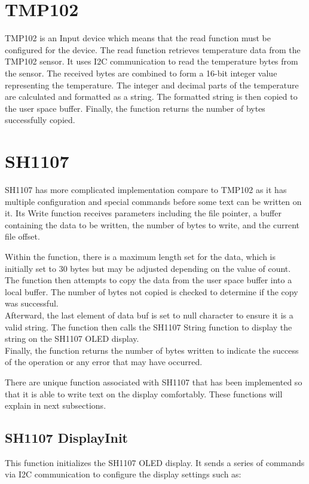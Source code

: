 \section{TMP102}
TMP102 is an Input device which means that the read function must be configured for the device. The read function retrieves temperature data from the TMP102 sensor. It uses I2C communication to read the temperature bytes from the sensor. The received bytes are combined to form a 16-bit integer value representing the temperature. The integer and decimal parts of the temperature are calculated and formatted as a string. The formatted string is then copied to the user space buffer. Finally, the function returns the number of bytes successfully copied.

\section{SH1107}
SH1107 has more complicated implementation compare to TMP102 as it has multiple configuration and special commands before some text can be written on it. Its Write function receives parameters including the file pointer, a buffer containing the data to be written, the number of bytes to write, and the current file offset.

Within the function, there is a maximum length set for the data, which is initially set to 30 bytes but may be adjusted depending on the value of count. The function then attempts to copy the data from the user space buffer into a local buffer. The number of bytes not copied is checked to determine if the copy was successful. \\ Afterward, the last element of data buf is set to null character to ensure it is a valid string. The function then calls the SH1107 String function to display the string on the SH1107 OLED display. \\
Finally, the function returns the number of bytes written to indicate the success of the operation or any error that may have occurred.

There are unique function associated with SH1107 that has been implemented so that it is able to write text on the display comfortably. These functions will explain in next subsections.

\subsection{SH1107 DisplayInit}
This function initializes the SH1107 OLED display. It sends a series of commands via I2C communication to configure the display settings such as:

